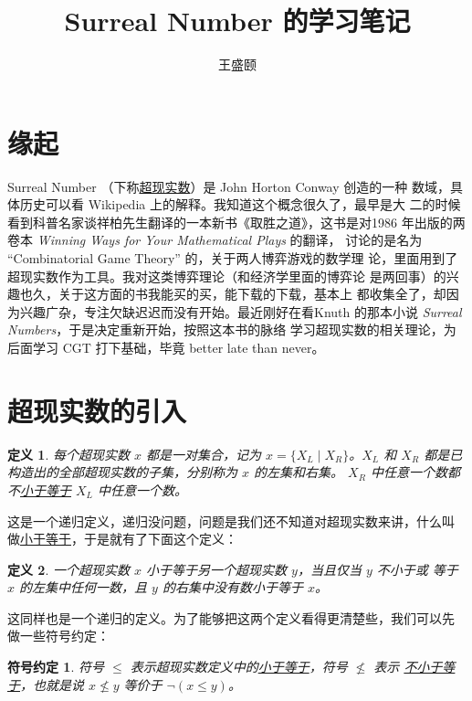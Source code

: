 \documentclass[cs4size,a4paper,adobefonts]{ctexart}
\newtheorem{defn}{定义}
\newtheorem*{symbolDef}{符号约定}
\newcommand{\pname}[1]{\underline{#1}}
\numberwithin{equation}{section}
\begin{document}
\title{\bfseries Surreal Number 的学习笔记}
\author{王盛颐}
\date{}
\maketitle
\section*{缘起}

Surreal Number （下称\pname{超现实数}）是 John Horton Conway 创造的一种
数域，具体历史可以看 Wikipedia 上的解释。我知道这个概念很久了，最早是大
二的时候看到科普名家谈祥柏先生翻译的一本新书《取胜之道》，这书是对1986
年出版的两卷本 \textit{Winning Ways for Your Mathematical Plays} 的翻译，
讨论的是名为 ``Combinatorial Game Theory'' 的，关于两人博弈游戏的数学理
论，里面用到了超现实数作为工具。我对这类博弈理论（和经济学里面的博弈论
  是两回事）的兴趣也久，关于这方面的书我能买的买，能下载的下载，基本上
都收集全了，却因为兴趣广杂，专注欠缺迟迟而没有开始。最近刚好在看Knuth
的那本小说 \textit{Surreal Numbers}，于是决定重新开始，按照这本书的脉络
学习超现实数的相关理论，为后面学习 CGT 打下基础，毕竟 better late than
never。

\section{超现实数的引入}
\begin{defn}
  \label{defn:Surreal}
  每个超现实数 $x$ 都是一对集合，记为 $x=\{X_L \mid X_R\}$。$X_L$ 和
  $X_R$ 都是已构造出的全部超现实数的子集，分别称为 $x$ 的左集和右集。
  $X_R$ 中任意一个数都不\pname{小于等于} $X_L$ 中任意一个数。
\end{defn}

这是一个递归定义，递归没问题，问题是我们还不知道对超现实数来讲，什么叫
做\pname{小于等于}，于是就有了下面这个定义：

\begin{defn}
  \label{defn:Leq}
  一个超现实数 $x$ 小于等于另一个超现实数 $y$，当且仅当 $y$ 不小于或
  等于 $x$ 的左集中任何一数，且 $y$ 的右集中没有数小于等于 $x$。
\end{defn}

这同样也是一个递归的定义。为了能够把这两个定义看得更清楚些，我们可以先
做一些符号约定：

\begin{symbolDef}
  符号 $\leq$ 表示超现实数定义中的\pname{小于等于}，符号 $\nleq$ 表示
  \pname{不小于等于}，也就是说 $x \nleq y$ 等价于 $\neg(x \leq y)$。
\end{symbolDef}
\end{document}
